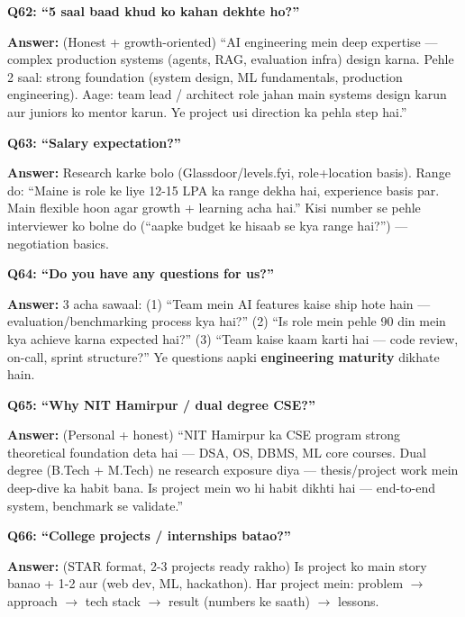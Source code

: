 \begin{interviewbox}
\textbf{Q62: ``5 saal baad khud ko kahan dekhte ho?''}

\textbf{Answer:} (Honest + growth-oriented) ``AI engineering mein deep expertise --- complex production systems (agents, RAG, evaluation infra) design karna. Pehle 2 saal: strong foundation (system design, ML fundamentals, production engineering). Aage: team lead / architect role jahan main systems design karun aur juniors ko mentor karun. Ye project usi direction ka pehla step hai.''
\end{interviewbox}

\begin{interviewbox}
\textbf{Q63: ``Salary expectation?''}

\textbf{Answer:} Research karke bolo (Glassdoor/levels.fyi, role+location basis). Range do: ``Maine is role ke liye 12-15 LPA ka range dekha hai, experience basis par. Main flexible hoon agar growth + learning acha hai.'' Kisi number se pehle interviewer ko bolne do (``aapke budget ke hisaab se kya range hai?'') --- negotiation basics.
\end{interviewbox}

\begin{interviewbox}
\textbf{Q64: ``Do you have any questions for us?''}

\textbf{Answer:} 3 acha sawaal: (1) ``Team mein AI features kaise ship hote hain --- evaluation/benchmarking process kya hai?'' (2) ``Is role mein pehle 90 din mein kya achieve karna expected hai?'' (3) ``Team kaise kaam karti hai --- code review, on-call, sprint structure?'' Ye questions aapki \textbf{engineering maturity} dikhate hain.
\end{interviewbox}

\begin{interviewbox}
\textbf{Q65: ``Why NIT Hamirpur / dual degree CSE?''}

\textbf{Answer:} (Personal + honest) ``NIT Hamirpur ka CSE program strong theoretical foundation deta hai --- DSA, OS, DBMS, ML core courses. Dual degree (B.Tech + M.Tech) ne research exposure diya --- thesis/project work mein deep-dive ka habit bana. Is project mein wo hi habit dikhti hai --- end-to-end system, benchmark se validate.''
\end{interviewbox}

\begin{interviewbox}
\textbf{Q66: ``College projects / internships batao?''}

\textbf{Answer:} (STAR format, 2-3 projects ready rakho) Is project ko main story banao + 1-2 aur (web dev, ML, hackathon). Har project mein: problem $\rightarrow$ approach $\rightarrow$ tech stack $\rightarrow$ result (numbers ke saath) $\rightarrow$ lessons.
\end{interviewbox}

